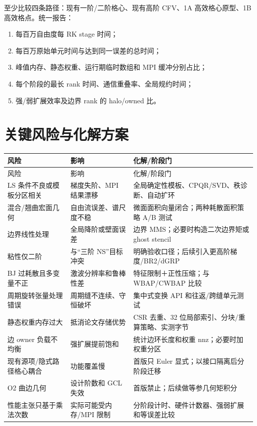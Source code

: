\documentclass[UTF8,a4paper,11pt,openany]{ctexrep}
\numberwithin{equation}{chapter}
\begin{document}
至少比较四条路径：现有一阶/二阶格心、现有高阶 CFV、1A 高效格心原型、1B 高效格点。统一报告：

\begin{enumerate}
  \item 每百万自由度每 RK stage 时间；
  \item 每百万原始单元时间与达到同一误差的总时间；
  \item 峰值内存、静态权重、运行期临时数组和 MPI 缓冲分别占比；
  \item 每个阶段的最长 rank 时间、通信重叠率、全局规约时间；
  \item 强/弱扩展效率及边界 rank 的 halo/owned 比。
\end{enumerate}

\chapter{关键风险与化解方案}

\begin{longtable}{>{\raggedright\arraybackslash}p{}p{}p{}}
\toprule
风险 & 影响 & 化解/阶段门\\
\midrule
\endfirsthead
\toprule
风险 & 影响 & 化解/阶段门\\
\midrule
\endhead
LS 条件不良或模板分区相关 & 梯度失阶、MPI 结果漂移 & 全局确定性模板、CPQR/SVD、秩诊断、自动扩环\\
混合/翘曲宏面几何 & 自由流误差、谱尺度不稳 & 微面面积向量闭合；两种耗散面积策略 A/B 测试\\
边界线性处理 & 全局降阶或壁面误差 & 边界 MMS；必要时构造二次边界矩或 ghost stencil\\
粘性仅二阶 & 与“三阶 NS”目标冲突 & 明确验收口径；后续引入更高阶梯度/BR2/dGRP\\
BJ 过耗散且多变量不正 & 激波分辨率和鲁棒性差 & 特征限制＋正性压缩；与 WBAP/CWBAP 比较\\
周期旋转张量处理错误 & 周期缝不连续、守恒破坏 & 集中式变换 API 和往返/跨缝单元测试\\
静态权重内存过大 & 抵消论文存储优势 & CSR 去重、32 位局部索引、分块/重算策略、实测字节\\
边 owner 负载不均衡 & 强扩展提前饱和 & 统计边环长度和权重 nnz；必要时加权重分区\\
现有源项/隐式路径格心耦合 & 功能覆盖慢 & 首版只 Euler 显式；以接口隔离后分阶段迁移\\
O2 曲边几何 & 设计阶数和 GCL 失效 & 首版禁止；后续做等参几何矩积分\\
性能主张只基于乘法次数 & 实际可能受内存/MPI 限制 & 分阶段计时、硬件计数器、强弱扩展和等误差比较\\
\bottomrule
\end{longtable}
\end{document}
